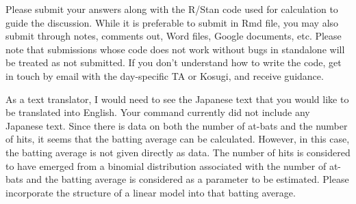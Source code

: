 \documentclass{ltjsbook}
\begin{document}
Please submit your answers along with the R/Stan code used for calculation to guide the discussion. While it is preferable to submit in Rmd file, you may also submit through notes, comments out, Word files, Google documents, etc. Please note that submissions whose code does not work without bugs in standalone will be treated as not submitted. If you don't understand how to write the code, get in touch by email with the day-specific TA or Kosugi, and receive guidance.

As a text translator, I would need to see the Japanese text that you would like to be translated into English. Your command currently did not include any Japanese text.
Since there is data on both the number of at-bats and the number of hits, it seems that the batting average can be calculated. However, in this case, the batting average is not given directly as data. The number of hits is considered to have emerged from a binomial distribution associated with the number of at-bats and the batting average is considered as a parameter to be estimated.
Please incorporate the structure of a linear model into that batting average.
\end{document}
